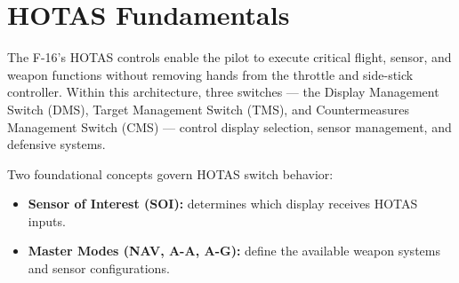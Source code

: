 \documentclass[11pt, a4paper, twoside]{report}
\begin{document}

\chapter{HOTAS Fundamentals}
\label{chap:C2}
The F-16’s HOTAS controls enable the pilot to execute critical flight, sensor, and weapon functions without removing hands from the throttle and side-stick controller. Within this architecture, three switches — the Display Management Switch (DMS), Target Management Switch (TMS), and Countermeasures Management Switch (CMS) — control display selection, sensor management, and defensive systems.

Two foundational concepts govern HOTAS switch behavior:

\begin{itemize}
    \item \textbf{Sensor of Interest (SOI):} determines which display receives HOTAS inputs.
    \item \textbf{Master Modes (NAV, A-A, A-G):} define the available weapon systems and sensor configurations.
\end{itemize}


\end{document}

